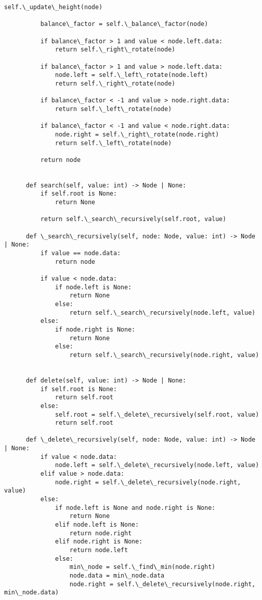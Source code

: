 \documentclass{jlreq}
\begin{document}
\begin{lstlisting}[caption=二分ヒープの実装, label=binaryheap, frame=TRBL, label={binaryheap}]
          self.\_update\_height(node)
          
          balance\_factor = self.\_balance\_factor(node)
          
          if balance\_factor > 1 and value < node.left.data:
              return self.\_right\_rotate(node)
          
          if balance\_factor > 1 and value > node.left.data:
              node.left = self.\_left\_rotate(node.left)
              return self.\_right\_rotate(node)
          
          if balance\_factor < -1 and value > node.right.data:
              return self.\_left\_rotate(node)
          
          if balance\_factor < -1 and value < node.right.data:
              node.right = self.\_right\_rotate(node.right)
              return self.\_left\_rotate(node)
          
          return node
          
      
      def search(self, value: int) -> Node | None:
          if self.root is None:
              return None
          
          return self.\_search\_recursively(self.root, value)
  
      def \_search\_recursively(self, node: Node, value: int) -> Node | None:
          if value == node.data:
              return node
          
          if value < node.data:
              if node.left is None:
                  return None
              else:
                  return self.\_search\_recursively(node.left, value)
          else:
              if node.right is None:
                  return None
              else:
                  return self.\_search\_recursively(node.right, value)
              
      
      def delete(self, value: int) -> Node | None:
          if self.root is None:
              return self.root
          else:
              self.root = self.\_delete\_recursively(self.root, value)
              return self.root
      
      def \_delete\_recursively(self, node: Node, value: int) -> Node | None:
          if value < node.data:
              node.left = self.\_delete\_recursively(node.left, value)
          elif value > node.data:
              node.right = self.\_delete\_recursively(node.right, value)
          else:
              if node.left is None and node.right is None:
                  return None
              elif node.left is None:
                  return node.right
              elif node.right is None:
                  return node.left
              else:
                  min\_node = self.\_find\_min(node.right)
                  node.data = min\_node.data
                  node.right = self.\_delete\_recursively(node.right, min\_node.data)
          

\end{lstlisting}
\end{document}
